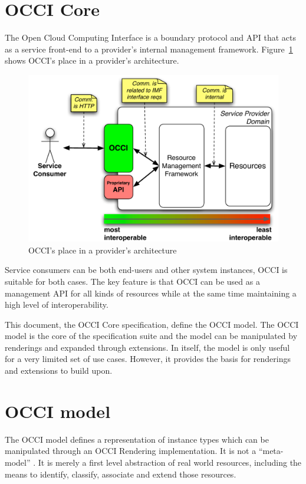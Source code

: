 \documentclass[10pt,a4paper,british]{article}
\begin{document}
\section{OCCI Core}
The Open Cloud Computing Interface is a boundary protocol and API
that acts as a service front-end to a provider's internal management
framework. Figure~\ref{fig:placement} shows OCCI's place in a
provider's architecture.
\begin{figure}[h]
	\centering
	\includegraphics[scale=0.5]{figs/occi-intro.pdf}
	\caption{OCCI's place in a provider's architecture}
	\label{fig:placement}
\end{figure}
Service consumers can be both end-users and other system instances, OCCI is
suitable for both cases. The key feature is that OCCI can be used as a
management API for all kinds of resources while at the same time maintaining a
high level of interoperability.

This document, the OCCI Core specification, define the OCCI model. The OCCI
model is the core of the specification suite and the model can be manipulated by
renderings and expanded through extensions. In itself, the model is only useful
for a very limited set of use cases. However, it provides the basis for
renderings and extensions to build upon.

\section{OCCI model}
The OCCI model defines a representation of instance types which can be
manipulated through an OCCI Rendering implementation. It is not a
``meta-model'' \cite{meta-model-ref-something}. It is merely a first level
abstraction of real world resources, including the means to identify, classify,
associate and extend those resources. 
\end{document}
